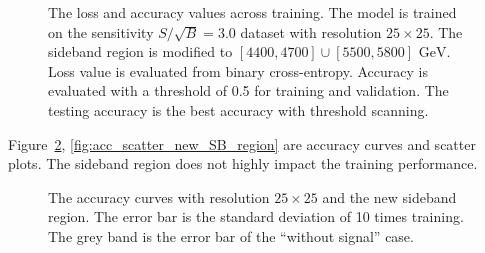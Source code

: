 \documentclass[12pt]{article}
\begin{document}
\begin{figure}[htpb]
{			}
			\caption{The loss and accuracy values across training. The model is trained on the sensitivity $S / \sqrt{B} = 3.0$ dataset with resolution $25\times 25$. The sideband region is modified to $[4400,4700] \cup [5500,5800] \text{ GeV}$. Loss value is evaluated from binary cross-entropy. Accuracy is evaluated with a threshold of 0.5 for training and validation. The testing accuracy is the best accuracy with threshold scanning.}
			\label{fig:loss_acc_across_training_SB_3_res_25_new_SB}
		\end{figure}

		Figure~\ref{fig:acc_curve_new_SB_region}, \ref{fig:acc_scatter_new_SB_region} are accuracy curves and scatter plots. The sideband region does not highly impact the training performance.
		\begin{figure}[htpb]
			\centering
			\caption{The accuracy curves with resolution $25\times 25$ and the new sideband region. The error bar is the standard deviation of 10 times training. The grey band is the error bar of the ``without signal'' case.}
			\label{fig:acc_curve_new_SB_region}
		\end{figure}
\end{document}
